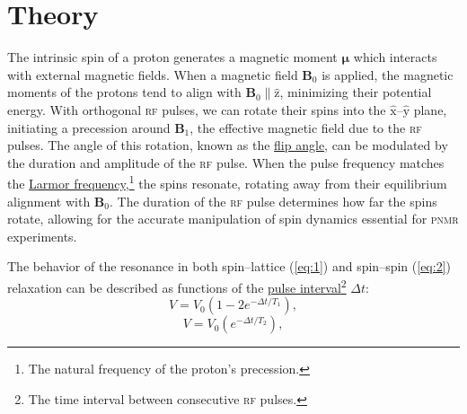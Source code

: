 \documentclass[12pt]{report}
\begin{document}
\section*{Theory}
{
    The intrinsic spin of a proton generates a magnetic moment $\bm{\mu}$ which interacts with external magnetic fields. When a magnetic field $\bm{B}_0$ is applied, the magnetic moments of the protons tend to align with $\bm{B}_0 \parallel \hat{\mathrm{z}}$, minimizing their potential energy. With orthogonal \textsc{rf} pulses, we can rotate their spins into the $\hat{\mathrm{x}}$–$\hat{\mathrm{y}}$ plane, initiating a precession around $\bm{B}_1$, the effective magnetic field due to the \textsc{rf} pulses. The angle of this rotation, known as the \ul{flip angle}, can be modulated by the duration and amplitude of the \textsc{rf} pulse. When the pulse frequency matches the \ul{Larmor frequency},\footnote{The natural frequency of the proton's precession.} the spins resonate, rotating away from their equilibrium alignment with $\bm{B}_0$. The duration of the \textsc{rf} pulse determines how far the spins rotate, allowing for the accurate manipulation of spin dynamics essential for \textsc{pnmr} experiments.

    The behavior of the resonance in both spin–lattice (\ref{eq:1}) and spin–spin (\ref{eq:2}) relaxation can be described as functions of the \ul{pulse interval}\footnote{The time interval between consecutive \textsc{rf} pulses.} $\Delta t$:
    \begin{equation}
        V = V_{0} \left( 1 - 2e^{-\Delta t/T_{1}} \right)\!,
        \label{eq:1}
    \end{equation}
    \begin{equation}
        V = V_{0} \left( e^{-\Delta t / T_{2}} \right)\!,
        \label{eq:2}
    \end{equation}
}
\end{document}
